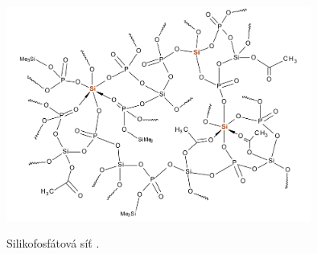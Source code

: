 \documentclass[
  printed, %
  table,   %
  lof,     %
  lot,     %
  oneside,
]{fithesis3}
\begin{document}
\begin{otherlanguage}{czech}

\begin{figure}[h!]
\caption{Silikofosfátová síť \cite{Styskalik2015thesis}. }
  \center
  \includegraphics[width=10cm]{si_polymer_cely.png}
  \label{si_polymer_cely}
  \end{figure}



\end{otherlanguage}
\end{document}
